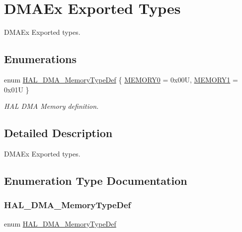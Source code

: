 \hypertarget{group___d_m_a_ex___exported___types}{}\section{D\+M\+A\+Ex Exported Types}
\label{group___d_m_a_ex___exported___types}


D\+M\+A\+Ex Exported types.  


\subsection*{Enumerations}
\begin{DoxyCompactItemize}
\item 
enum \hyperlink{group___d_m_a_ex___exported___types_ga9cec283a461e47eda968838c35fd6eed}{H\+A\+L\+\_\+\+D\+M\+A\+\_\+\+Memory\+Type\+Def} \{ \hyperlink{group___d_m_a_ex___exported___types_gga9cec283a461e47eda968838c35fd6eeda2dec05a318eee29371114f1a8f6fe3f4}{M\+E\+M\+O\+R\+Y0} = 0x00U, 
\hyperlink{group___d_m_a_ex___exported___types_gga9cec283a461e47eda968838c35fd6eeda06080dfa68716b5bbf425d9232b144c3}{M\+E\+M\+O\+R\+Y1} = 0x01U
 \}\begin{DoxyCompactList}\small\item\em H\+AL D\+MA Memory definition. \end{DoxyCompactList}
\end{DoxyCompactItemize}


\subsection{Detailed Description}
D\+M\+A\+Ex Exported types. 



\subsection{Enumeration Type Documentation}
\mbox{\label{group___d_m_a_ex___exported___types_ga9cec283a461e47eda968838c35fd6eed}} 
\subsubsection{\texorpdfstring{H\+A\+L\+\_\+\+D\+M\+A\+\_\+\+Memory\+Type\+Def}{HAL\_DMA\_MemoryTypeDef}}
{\footnotesize\ttfamily enum \hyperlink{group___d_m_a_ex___exported___types_ga9cec283a461e47eda968838c35fd6eed}{H\+A\+L\+\_\+\+D\+M\+A\+\_\+\+Memory\+Type\+Def}}



